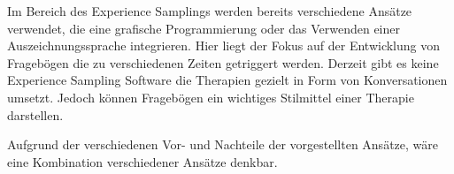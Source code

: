 Im Bereich des Experience Samplings werden bereits verschiedene Ansätze verwendet, die eine grafische Programmierung oder das Verwenden einer Auszeichnungssprache integrieren. Hier liegt der Fokus auf der Entwicklung von Fragebögen die zu verschiedenen Zeiten getriggert werden. Derzeit gibt es keine Experience Sampling Software die Therapien gezielt in Form von Konversationen umsetzt. Jedoch können Fragebögen ein wichtiges Stilmittel einer Therapie darstellen. 

Aufgrund der verschiedenen Vor- und Nachteile der vorgestellten Ansätze, wäre eine Kombination verschiedener Ansätze denkbar. 










